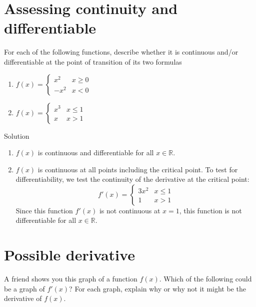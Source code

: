 \documentclass[12pt]{article}
\begin{document}
\section{Assessing continuity and differentiable }
For each of the following functions, describe whether it is continuous and/or differentiable at
the point of transition of its two formulas
\begin{enumerate}
    \item $f(x) = \begin{cases}
        x^2 & x \geq 0
        \\ -x^2 & x<0
    \end{cases}
    $
    \item $f(x) = \begin{cases}
        x^3 & x \leq 1
        \\ x & x>1
    \end{cases}$
\end{enumerate}
Solution
\begin{enumerate}
    \item $f(x)$ is continuous and differentiable for all $x\in \mathbb{R}$. 
    \item $f(x)$ is continuous at all points including the critical point. To test for differentiability, we test the continuity of the derivative at the critical point: \[ f'(x) = \begin{cases}
        3x^2 & x \leq 1
        \\ 1 & x>1
    \end{cases}\]
    Since this function $f'(x)$ is not continuous at $x=1$, this function is not differentiable for all $x\in \mathbb{R}.$
\end{enumerate}

\section{Possible derivative}
A friend shows you this graph of a function $f(x)$. Which of the following could be a graph of $f'(x)$? For each graph, explain why or why not it
might be the derivative of $f(x)$.
\end{document}
